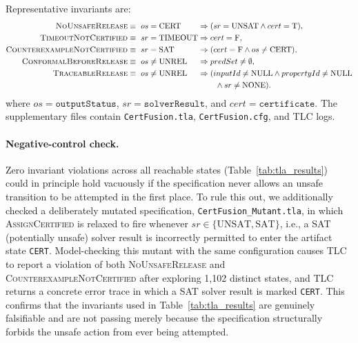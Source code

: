 \documentclass[preprint,11pt]{elsarticle}
\begin{document}
Representative invariants are:
\begingroup
\scriptsize
\begin{equation}
\begin{alignedat}{2}
\textsc{NoUnsafeRelease}\equiv{}&
\ os=\mathrm{CERT}
&&\Rightarrow
(sr=\mathrm{UNSAT}\wedge cert=\mathrm{T}),\\
\textsc{TimeoutNotCertified}\equiv{}&
\ sr=\mathrm{TIMEOUT}
&&\Rightarrow
cert=\mathrm{F},\\
\textsc{CounterexampleNotCertified}\equiv{}&
\ sr=\mathrm{SAT}
&&\Rightarrow
(cert=\mathrm{F}\wedge os\neq\mathrm{CERT}),\\
\textsc{ConformalBeforeRelease}\equiv{}&
\ os\neq\mathrm{UNREL}
&&\Rightarrow
predSet\neq\emptyset,\\
\textsc{TraceableRelease}\equiv{}&
\ os\neq\mathrm{UNREL}
&&\Rightarrow
(inputId\neq\mathrm{NULL}
\wedge propertyId\neq\mathrm{NULL}\\
&&&\hspace{2.2em}
\wedge sr\neq\mathrm{NONE}).
\end{alignedat}
\end{equation}
\endgroup
where $os=\texttt{outputStatus}$, $sr=\texttt{solverResult}$, and $cert=\texttt{certificate}$.
The supplementary files contain \texttt{CertFusion.tla}, \texttt{CertFusion.cfg}, and TLC logs.

\paragraph{Negative-control check.}
Zero invariant violations across all reachable states (Table~\ref{tab:tla_results}) could in principle hold vacuously if the specification never allows an unsafe transition to be attempted in the first place. To rule this out, we additionally checked a deliberately mutated specification, \texttt{CertFusion\_Mutant.tla}, in which \textsc{AssignCertified} is relaxed to fire whenever $sr\in\{\mathrm{UNSAT},\mathrm{SAT}\}$, i.e., a SAT (potentially unsafe) solver result is incorrectly permitted to enter the artifact state \texttt{CERT}. Model-checking this mutant with the same configuration causes TLC to report a violation of both \textsc{NoUnsafeRelease} and \textsc{CounterexampleNotCertified} after exploring 1,102 distinct states, and TLC returns a concrete error trace in which a SAT solver result is marked \texttt{CERT}. This confirms that the invariants used in Table~\ref{tab:tla_results} are genuinely falsifiable and are not passing merely because the specification structurally forbids the unsafe action from ever being attempted.
\end{document}
